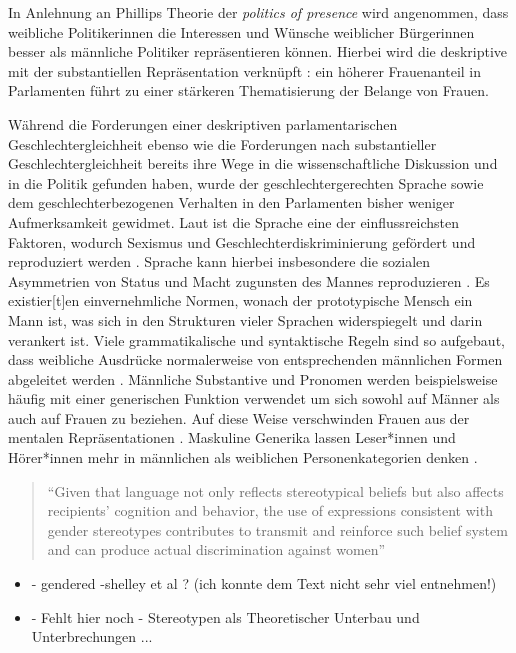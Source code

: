 \documentclass[12pt, 
    twoside=false, 
    bibliography=totoc, 
    numbers=endperiod, 
    headings=normal, 
    toc=chapterentrydotfill
    ]{scrbook}
\begin{document}
In Anlehnung an Phillips Theorie der \emph{politics of presence} \parencite*{phillips_1998} wird angenommen, dass weibliche Politikerinnen die Interessen und Wünsche weiblicher Bürgerinnen besser als männliche Politiker repräsentieren können. Hierbei wird die deskriptive mit der substantiellen Repräsentation verknüpft \parencite[52]{wangnerud_2009} : ein höherer Frauenanteil in Parlamenten führt zu einer stärkeren Thematisierung der Belange von Frauen.

Während die Forderungen einer deskriptiven parlamentarischen Geschlechtergleichheit ebenso wie die Forderungen nach substantieller Geschlechtergleichheit bereits ihre Wege in die wissenschaftliche Diskussion und in die Politik gefunden haben, wurde der geschlechtergerechten Sprache sowie dem geschlechterbezogenen Verhalten in den Parlamenten bisher weniger Aufmerksamkeit gewidmet. 
Laut \textcite{menegatti_2017} ist die Sprache eine der einflussreichsten Faktoren, wodurch Sexismus und Geschlechterdiskriminierung gefördert und reproduziert werden \parencite*[1]{menegatti_2017}. Sprache kann hierbei insbesondere die sozialen Asymmetrien von Status und Macht zugunsten des Mannes reproduzieren \parencite[1]{menegatti_2017}. Es existier[t]en einvernehmliche Normen, wonach der prototypische Mensch ein Mann ist, was sich in den Strukturen vieler Sprachen widerspiegelt und darin verankert ist. Viele grammatikalische und syntaktische Regeln sind so aufgebaut, dass weibliche Ausdrücke normalerweise von entsprechenden männlichen Formen abgeleitet werden \parencite*[1]{menegatti_2017}. Männliche Substantive und Pronomen werden beispielsweise häufig mit einer generischen Funktion verwendet um sich sowohl auf Männer als auch auf Frauen zu beziehen. Auf diese Weise verschwinden Frauen aus der mentalen Repräsentationen \parencites{vaughan_2018}{stahlberg_2001}. Maskuline Generika lassen Leser*innen und Hörer*innen mehr in männlichen als weiblichen Personenkategorien denken \parencites[2]{sczesny_2016}{stahlberg_2007}.

\begin{quote}
    \enquote{Given that language not only reflects stereotypical beliefs but also affects recipients’ cognition and behavior, the use of expressions consistent with gender stereotypes contributes to transmit and reinforce such belief system and can produce actual discrimination against women} \parencite[2]{menegatti_2017}
\end{quote}

\begin{itemize}

\item - gendered -shelley et al ? (ich konnte dem Text nicht sehr viel entnehmen!) 
\item - Fehlt hier noch - Stereotypen als Theoretischer Unterbau und Unterbrechungen ...
\end{itemize}
\end{document}

